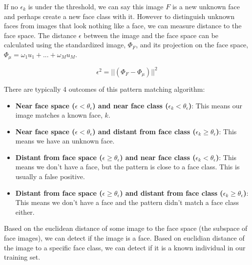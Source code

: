 \documentclass{article}
\begin{document}
\noindent If no $\epsilon_k$ is under the threshold, we can say this image $F$ is a new unknown face and perhaps create a new face class with it. However to distinguish unknown faces from images that look nothing like a face, we can measure distance to the face space. The distance $\epsilon$ between the image and the face space can be calculated using the standardized image, $\Phi_F$, and its projection on the face space, $\Phi_\mu = \omega_1u_1 + ... + \omega_Mu_M$. 

$$\epsilon^2 = ||(\Phi_F - \Phi_\mu)||^2$$


\noindent There are typically 4 outcomes of this pattern matching algorithm: 
\begin{itemize}
    \item \textbf{Near face space ($\epsilon < \theta_\epsilon$) and near face class ($\epsilon_k < \theta_\epsilon$)}: This means our image matches a known face, $k$.
    \item \textbf{Near face space ($\epsilon < \theta_\epsilon$) and distant from face class ($\epsilon_k \geq \theta_\epsilon$)}: This means we have an unknown face. 
    \item \textbf{Distant from face space ($\epsilon \geq \theta_\epsilon$) and near face class ($\epsilon_k < \theta_\epsilon$)}: This means we don't have a face, but the pattern is close to a face class. This is usually a false positive. 
    \item \textbf{Distant from face space ($\epsilon \geq \theta_\epsilon$) and distant from face class ($\epsilon_k \geq \theta_\epsilon$)}: This means we don't have a face and the pattern didn't match a face class either.
\end{itemize}

\noindent Based on the euclidean distance of some image to the face space (the subspace of face images), we can detect if the image is a face. Based on euclidian distance of the image to a specific face class, we can detect if it is a known individual in our training set. 
\end{document}
